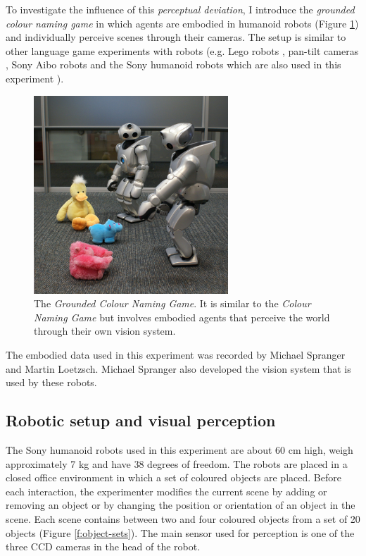 To investigate the influence of this \emph{perceptual deviation}, I
introduce the \emph{grounded colour naming game} in which agents are
embodied in humanoid robots (Figure
\ref{f:grounded-colour-naming-game}) and individually perceive scenes
through their cameras. The setup is similar to other language game
experiments with robots (e.g. Lego robots \citep{vogt03anchoring},
pan-tilt cameras \citep{steels98origins}, Sony Aibo robots
\citep{steels09perspective, loetzsch08typological} and the Sony
humanoid robots which are also used in this experiment
\citep{wellens08flexible}).

\begin{figure}[htpb]
  \centerline{\includegraphics[width=0.65\textwidth]{./experiments/figures/grounding-cng-small}}
  \caption[The Grounded Colour Naming Game]{The \emph{Grounded Colour
      Naming Game}. It is similar to the \emph{Colour Naming Game} but
    involves embodied agents that perceive the world through their own
    vision system.}
\label{f:grounded-colour-naming-game}
\end{figure}

The embodied data used in this experiment was recorded by Michael
Spranger and Martin Loetzsch. Michael Spranger also developed the
vision system that is used by these robots.

\subsection{Robotic setup and visual perception}

The Sony humanoid robots \citep{fujita03autonomous} used in this
experiment are about 60 cm high, weigh approximately 7 kg and have 38
degrees of freedom. The robots are placed in a closed office
environment in which a set of coloured objects are placed. Before each
interaction, the experimenter modifies the current scene by adding or
removing an object or by changing the position or orientation of an
object in the scene. Each scene contains between two and four coloured
objects from a set of 20 objects (Figure \ref{f:object-sets}). The
main sensor used for perception is one of the three CCD cameras in the
head of the robot.

